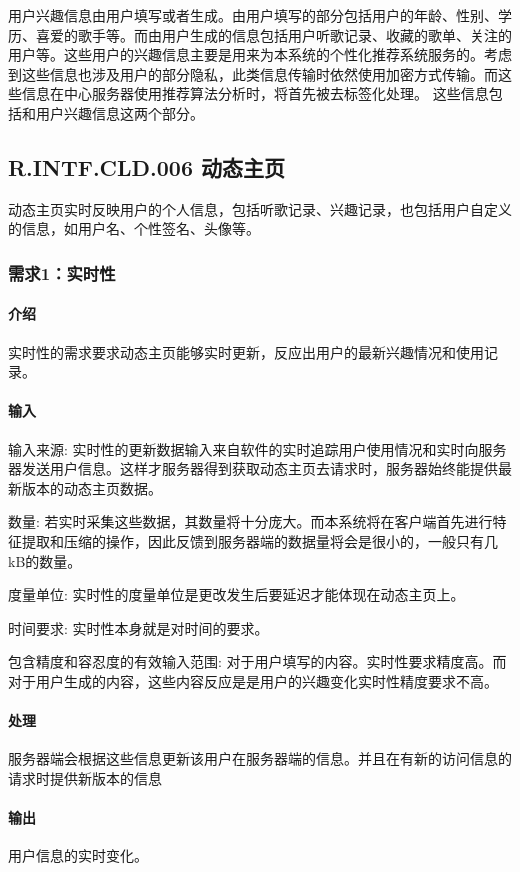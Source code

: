 用户兴趣信息由用户填写或者生成。由用户填写的部分包括用户的年龄、性别、学历、喜爱的歌手等。而由用户生成的信息包括用户听歌记录、收藏的歌单、关注的用户等。这些用户的兴趣信息主要是用来为本系统的个性化推荐系统服务的。考虑到这些信息也涉及用户的部分隐私，此类信息传输时依然使用加密方式传输。而这些信息在中心服务器使用推荐算法分析时，将首先被去标签化处理。
这些信息包括和用户兴趣信息这两个部分。

\subsection{R.INTF.CLD.006 动态主页}
动态主页实时反映用户的个人信息，包括听歌记录、兴趣记录，也包括用户自定义的信息，如用户名、个性签名、头像等。

\subsubsection{需求1：实时性}
\paragraph{介绍}
实时性的需求要求动态主页能够实时更新，反应出用户的最新兴趣情况和使用记录。
\paragraph{输入}

输入来源:
实时性的更新数据输入来自软件的实时追踪用户使用情况和实时向服务器发送用户信息。这样才服务器得到获取动态主页去请求时，服务器始终能提供最新版本的动态主页数据。

数量:
若实时采集这些数据，其数量将十分庞大。而本系统将在客户端首先进行特征提取和压缩的操作，因此反馈到服务器端的数据量将会是很小的，一般只有几kB的数量。

度量单位:
实时性的度量单位是更改发生后要延迟才能体现在动态主页上。

时间要求:
实时性本身就是对时间的要求。

包含精度和容忍度的有效输入范围:
对于用户填写的内容。实时性要求精度高。而对于用户生成的内容，这些内容反应是是用户的兴趣变化实时性精度要求不高。

\paragraph{处理}
服务器端会根据这些信息更新该用户在服务器端的信息。并且在有新的访问信息的请求时提供新版本的信息

\paragraph{输出}
用户信息的实时变化。




